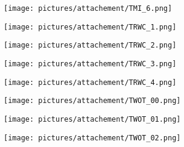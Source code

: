 \begin{figure} \ContinuedFloat
        \centering
        \begin{subfigure}{.49\textwidth}
                \centering
                \texttt{[image: pictures/attachement/TMI\_6.png]}
        \end{subfigure}
        \begin{subfigure}{.49\textwidth}
                \centering
                \texttt{[image: pictures/attachement/TRWC\_1.png]}
        \end{subfigure}
\end{figure}
\begin{figure} \ContinuedFloat
        \centering
        \begin{subfigure}{.49\textwidth}
                \centering
                \texttt{[image: pictures/attachement/TRWC\_2.png]}
        \end{subfigure}
        \begin{subfigure}{.49\textwidth}
                \centering
                \texttt{[image: pictures/attachement/TRWC\_3.png]}
        \end{subfigure}
\end{figure}
\begin{figure} \ContinuedFloat
        \centering
        \begin{subfigure}{.49\textwidth}
                \centering
                \texttt{[image: pictures/attachement/TRWC\_4.png]}
        \end{subfigure}
        \begin{subfigure}{.49\textwidth}
                \centering
                \texttt{[image: pictures/attachement/TWOT\_00.png]}
        \end{subfigure}
\end{figure}
\begin{figure} \ContinuedFloat
        \centering
        \begin{subfigure}{.49\textwidth}
                \centering
                \texttt{[image: pictures/attachement/TWOT\_01.png]}
        \end{subfigure}
        \begin{subfigure}{.49\textwidth}
                \centering
                \texttt{[image: pictures/attachement/TWOT\_02.png]}
        \end{subfigure}
\end{figure}
